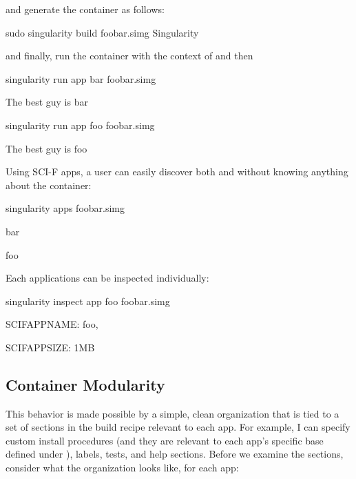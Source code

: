 \documentclass[letterpaper,10pt,english]{sphinxmanual}
\begin{document}
and generate the container as follows:

%
\begin{sphinxVerbatim}[commandchars=\\\{\}]
\PYGZdl{} sudo singularity build foobar.simg Singularity
\end{sphinxVerbatim}

and finally, run the container with the context of  and then 

%
\begin{sphinxVerbatim}[commandchars=\\\{\}]
\PYGZdl{} singularity run \PYGZhy{}\PYGZhy{}app bar foobar.simg

The best guy is bar

\PYGZdl{} singularity run \PYGZhy{}\PYGZhy{}app foo foobar.simg

The best guy is foo
\end{sphinxVerbatim}

Using SCI-F apps, a user can easily discover both  and  without knowing
anything about the container:

%
\begin{sphinxVerbatim}[commandchars=\\\{\}]
singularity apps foobar.simg

bar

foo
\end{sphinxVerbatim}

Each applications can be inspected individually:

%
\begin{sphinxVerbatim}[commandchars=\\\{\}]
singularity inspect \PYGZhy{}\PYGZhy{}app foo  foobar.simg

\PYGZob{}

    \PYGZdq{}SCIF\PYGZus{}APP\PYGZus{}NAME\PYGZdq{}: \PYGZdq{}foo\PYGZdq{},

    \PYGZdq{}SCIF\PYGZus{}APP\PYGZus{}SIZE\PYGZdq{}: \PYGZdq{}1MB\PYGZdq{}

\PYGZcb{}
\end{sphinxVerbatim}


\subsection{Container Modularity}
\label{\detokenize{reproducible_scif_apps:container-modularity}}
This behavior is made possible by a simple, clean organization that
is tied to a set of sections in the build recipe relevant to each app.
For example, I can specify custom install procedures (and they are
relevant to each app’s specific base defined under ), labels, tests, and
help sections. Before we examine the sections, consider what the organization looks like, for each app:
\end{document}
